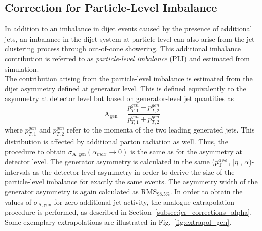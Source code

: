 \subsection{Correction for Particle-Level Imbalance}
\label{subsec:jer_corrections_pli}
In addition to an imbalance in dijet events caused by the presence of additional jets, an imbalance in the dijet system at particle level can also arise from the jet clustering process through out-of-cone showering. This additional imbalance contribution is referred to as \textit{particle-level imbalance} (PLI) and estimated from simulation. \\
The contribution arising from the particle-level imbalance is estimated from the dijet asymmetry defined at generator level. This is defined equivalently to the asymmetry at detector level but based on generator-level jet quantities as
\begin{equation}
  \mathrm{A_{gen}} = \frac{p_{T,1}^{gen} - p_{T,2}^{gen}}{p_{T,1}^{gen} + p_{T,2}^{gen}} 
 \end{equation}
where $p_{T,1}^{gen}$ and $p_{T,2}^{gen}$ refer to the momenta of the two leading generated jets. This distribution is affected by additional parton radiation as well. Thus, the procedure to obtain $\sigma_\mathrm{A,gen}(\alpha_{max} \rightarrow 0)$ is the same as for the asymmetry at detector level. The generator asymmetry is calculated in the same ($p_{\text{T}}^{ave}$, $|\eta|$, $\alpha$)-intervals as the detector-level asymmetry in order to derive the size of the particle-level imbalance for exactly the same events. The asymmetry width of the generator asymmetry is again calculated as $\mathrm{RMS}_{98.5\%}$. In order to obtain the values of $\sigma_\mathrm{A,gen}$ for zero additional jet activity, the analogue extrapolation procedure is performed, as described in Section~\ref{subsec:jer_corrections_alpha}. Some exemplary extrapolations are illustrated in Fig.~\ref{fig:extrapol_gen}. \\
